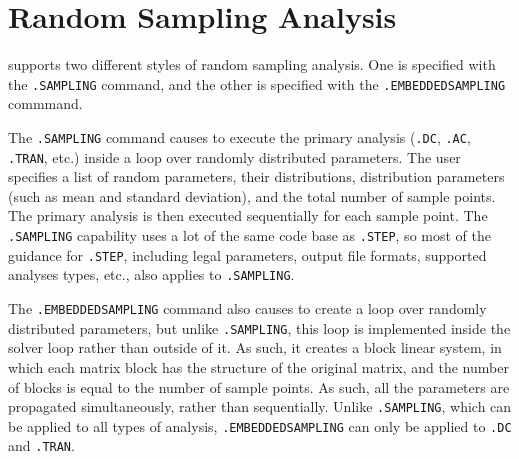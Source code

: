 

\clearpage
\section{Random Sampling Analysis}
\label{SAMPLING_Analysis}
\label{sampling_Overview}
  

\Xyce{} supports two different styles of random sampling analysis.  One is specified 
with the \verb|.SAMPLING| 
command, and the other is specified with the \verb|.EMBEDDEDSAMPLING| commmand.

The \verb|.SAMPLING| command causes \Xyce{} to execute the primary analysis (\verb|.DC|,
\verb|.AC|, \verb|.TRAN|, etc.) inside a loop over randomly distributed parameters.  
The user specifies a list of random parameters, their distributions, distribution 
parameters (such as mean and standard deviation), and the total number of 
sample points.  The primary analysis is then executed sequentially for each sample point.
The \verb|.SAMPLING| capability uses a lot of the same code base as \verb|.STEP|, 
so most of the guidance for \verb|.STEP|, including legal parameters, output 
file formats, supported analyses types, etc., also applies to \verb|.SAMPLING|.

The \verb|.EMBEDDEDSAMPLING| command also causes \Xyce{} to create a loop over 
randomly distributed parameters, but unlike \verb|.SAMPLING|, this loop is 
implemented inside the solver loop rather than outside of it.  As such, it 
creates a block linear system, in which each matrix block has the structure 
of the original matrix, and the number of blocks is equal to the number of sample points.
As such, all the parameters are propagated simultaneously, rather than sequentially.
Unlike \verb|.SAMPLING|, which can be applied to all types of \Xyce{} analysis, 
\verb|.EMBEDDEDSAMPLING| can only be applied to \verb|.DC| and \verb|.TRAN|.

